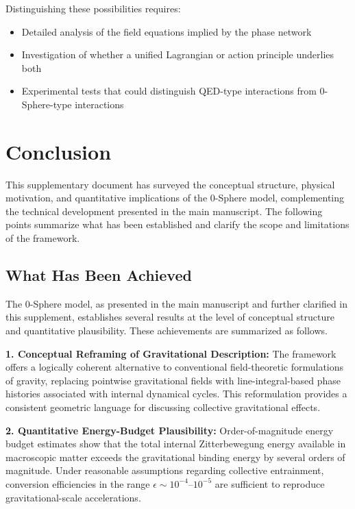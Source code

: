 \documentclass[12pt,letterpaper]{article}
\begin{document}
Distinguishing these possibilities requires:
\begin{itemize}
\item Detailed analysis of the field equations implied by the phase network
\item Investigation of whether a unified Lagrangian or action principle underlies both
\item Experimental tests that could distinguish QED-type interactions from 0-Sphere-type interactions
\end{itemize}



\section{Conclusion}
\label{sec:conclusion}

\justifying

This supplementary document has surveyed the conceptual structure, physical motivation, and quantitative implications of the 0-Sphere model, complementing the technical development presented in the main manuscript. The following points summarize what has been established and clarify the scope and limitations of the framework.

\subsection{What Has Been Achieved}
\label{subsec:achieved}

The 0-Sphere model, as presented in the main manuscript and further clarified in this supplement, establishes several results at the level of conceptual structure and quantitative plausibility. These achievements are summarized as follows.

\textbf{1. Conceptual Reframing of Gravitational Description:} The framework offers a logically coherent alternative to conventional field-theoretic formulations of gravity, replacing pointwise gravitational fields with line-integral-based phase histories associated with internal dynamical cycles. This reformulation provides a consistent geometric language for discussing collective gravitational effects.

\textbf{2. Quantitative Energy-Budget Plausibility:} Order-of-magnitude energy budget estimates show that the total internal Zitterbewegung energy available in macroscopic matter exceeds the gravitational binding energy by several orders of magnitude. Under reasonable assumptions regarding collective entrainment, conversion efficiencies in the range $\epsilon \sim 10^{-4}$--$10^{-5}$ are sufficient to reproduce gravitational-scale accelerations.
\end{document}
